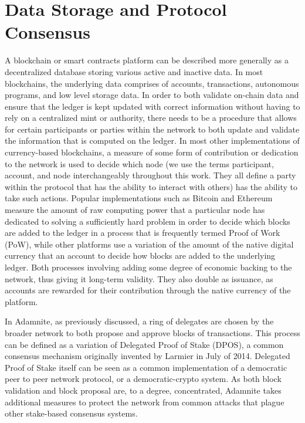 \documentclass[conference]{IEEEtran}
\begin{document}
\section{Data Storage and Protocol Consensus}
A blockchain or smart contracts platform can be described more generally as a decentralized database storing various active and inactive data. In most blockchains, the underlying data comprises of accounts, transactions, autonomous programs, and low level storage data. In order to both validate on-chain data and ensure that the ledger is kept updated with correct information without having to rely on a centralized mint or authority, there needs to be a procedure that allows for certain participants or parties within the network to both update and validate the information that is computed on the ledger. In most other implementations of currency-based blockchains, a measure of some form of contribution or dedication to the network is used to decide which node (we use the terms participant, account, and node interchangeably throughout this work. They all define a party within the protocol that has the ability to interact with others) has the ability to take such actions. Popular implementations such as Bitcoin and Ethereum measure the amount of raw computing power that a particular node has dedicated to solving a sufficiently hard problem in order to decide which blocks are added to the ledger in a process that is frequently termed Proof of Work (PoW), while other platforms use a variation of the amount of the native digital currency that an account to decide how blocks are added to the underlying ledger. Both processes involving adding some degree of economic backing to the network, thus giving it long-term validity. They also double as issuance, as accounts are rewarded for their contribution through the native currency of the platform.

In Adamnite, as previously discussed, a ring of delegates are chosen by the broader network to both propose and approve blocks of transactions. This process can be defined as a variation of Delegated Proof of Stake (DPOS), a common consensus mechanism originally invented by Larmier \cite{Larmier2014DPOS} in July of 2014. Delegated Proof of Stake itself can be seen as a common implementation of a democratic peer to peer network protocol, or a democratic-crypto system. As both block validation and block proposal are, to a degree, concentrated, Adamnite takes additional measures to protect the network from common attacks that plague other stake-based consensus systems.
\end{document}

